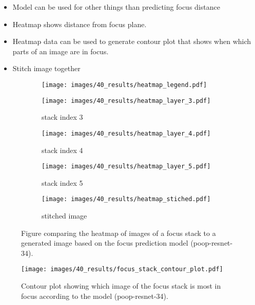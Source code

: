 \begin{itemize}
    \item Model can be used for other things than predicting focus distance
    \item Heatmap shows distance from focus plane.
    \item Heatmap data can be used to generate contour plot that shows when which parts of an image are in focus.
    \item Stitch image together
\end{itemize}

\begin{figure}
    \centering
    \begin{subfigure}[b]{0.75\textwidth}
        \centering
        \texttt{[image: images/40\_results/heatmap\_legend.pdf]}
    \end{subfigure}
    \begin{subfigure}[b]{0.5\textwidth}
        \centering
        \caption{stack index 3}
        \texttt{[image: images/40\_results/heatmap\_layer\_3.pdf]}
        \label{fig:Results:Stack:HeatMap:Stack3}
    \end{subfigure}%
    \begin{subfigure}[b]{0.5\textwidth}
        \centering
        \caption{stack index 4}
        \texttt{[image: images/40\_results/heatmap\_layer\_4.pdf]}
        \label{fig:Results:Stack:HeatMap:Stack4}
    \end{subfigure}
    \par
    \begin{subfigure}[b]{0.5\textwidth}
        \centering
        \caption{stack index 5}
        \texttt{[image: images/40\_results/heatmap\_layer\_5.pdf]}
        \label{fig:Results:Stack:HeatMap:Stack5}
    \end{subfigure}%
    \begin{subfigure}[b]{0.5\textwidth}
        \centering
        \caption{stitched image}
        \texttt{[image: images/40\_results/heatmap\_stiched.pdf]}
        \label{fig:Results:Stack:HeatMap:Stiched}
    \end{subfigure}
    \caption{Figure comparing the heatmap of images of a focus stack to a generated image based on the focus prediction model (\acs{poop}-\acs{resnet}-34).}
    \label{fig:Results:Stack:HeatMap}
\end{figure}

\begin{figure}
    \centering
    \texttt{[image: images/40\_results/focus\_stack\_contour\_plot.pdf]}
    \caption{Contour plot showing which image of the focus stack is most in focus according to the model (\acs{poop}-\acs{resnet}-34).}
    \label{fig:Results:Stack:ContourPlot}
\end{figure}


